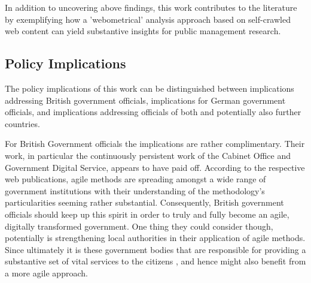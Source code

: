 In addition to uncovering above findings, this work contributes to the literature by exemplifying how a 'webometrical' analysis approach \parencite{Thelwall2009} based on self-crawled web content can yield substantive insights for public management research. 

\subsection{Policy Implications}\label{Policy Implications}
The policy implications of this work can be distinguished between implications addressing British government officials, implications for German government officials, and implications addressing officials of both and potentially also further countries.

For British Government officials the implications are rather complimentary. Their work, in particular the continuously persistent work of the Cabinet Office and Government Digital Service, appears to have paid off. According to the respective web publications, agile methods are spreading amongst a wide range of government institutions with their understanding of the methodology's particularities seeming rather substantial. Consequently, British government officials should keep up this spirit in order to truly and fully become an agile, digitally transformed government. One thing they could consider though, potentially is strengthening local authorities in their application of agile methods. Since ultimately it is these government bodies that are responsible for providing a substantive set of vital services to the citizens \parencite{LocalGovernmentAssociation2020}, and hence might also benefit from a more agile approach.

